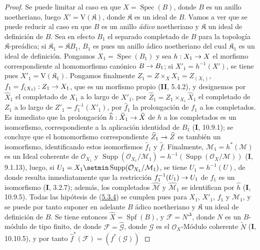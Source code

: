 \documentclass[10pt,oneside,openany]{book}
\theoremstyle{egaenv}\newtheorem*{env}{---}
\theoremstyle{egastatement}
\theoremstyle{egadescription}
\newcommand{\oldpage}[2][]{\marginnote{\normalfont\scriptsize\textbf{#1}\,|\,#2}\ignorespaces}
\renewcommand{\to}{\mathchoice{\longrightarrow}{\rightarrow}{\rightarrow}{\rightarrow}}
\begin{document}
\begin{proof}
Se puede limitar al caso en que $X=\operatorname{Spec}(B)$, donde $B$ es un anillo
noetheriano, luego $X'=\mathrm V(\mathfrak K)$, donde $\mathfrak K$ es un ideal de
$B$. Vamos a ver que se puede reducir al caso en que $B$ es un anillo \emph{ádico}
noetheriano y $\mathfrak K$ un ideal de definición de $B$. Sea en efecto $B_1$ el
separado completado de $B$ para la topología $\mathfrak K$-preádica; si
$\mathfrak K_1=\mathfrak K B_1$, $B_1$ es pues un
\oldpage[III]{155}
anillo ádico noetheriano del cual $\mathfrak K_1$ es un ideal de definición. Pongamos
$X_1=\operatorname{Spec}(B_1)$ y sea $h:X_1\to X$ el morfismo correspondiente al
homomorfismo canónico $B\to B_1$; si $X'_1=h^{-1}(X')$, se tiene pues
$X'_1=\mathrm V(\mathfrak K_1)$. Pongamos finalmente
$Z_1=Z\times_X X_1=Z_{(X_1)}$, $f_1=f_{(X_1)}:Z_1\to X_1$, que es un morfismo
propio (\textbf{II}, 5.4.2), y designemos por $\widehat X_1$ el completado de $X_1$ a lo largo
de $X'_1$, por
$\widehat Z_1=Z_1\times_{X_1}\widehat X_1$ el completado de $Z_1$ a lo largo de
$Z'_1=f_1^{-1}(X'_1)$, por $\widehat f_1$ la prolongación de $f_1$ a los completados.
Es inmediato que la prolongación $\widehat h:\widehat X_1\to\widehat X$ de $h$
a los completados es un isomorfismo, correspondiente a la aplicación identidad de $B_1$
(\textbf{I}, 10.9.1); se concluye que el homomorfismo correspondiente
$\widehat Z_1\to\widehat Z$ es también un isomorfismo, identificando estos isomorfismos
$\widehat f_1$ y $\widehat f$. Finalmente,
$\mathcal M_1=h^*(\mathcal M)$ es un Ideal coherente de $\mathcal O_{X_1}$ y
$\operatorname{Supp}(\mathcal O_{X_1}/\mathcal M_1)
=h^{-1}(\operatorname{Supp}(\mathcal O_X/\mathcal M))$
(\textbf{I}, 9.1.13), luego, si
$U_1=X_1\setmin\operatorname{Supp}(\mathcal O_{X_1}/\mathcal M_1)$, se tiene
$U_1=h^{-1}(U)$, de donde resulta inmediatamente que la restricción
$f_1^{-1}(U_1)\to U_1$ de $f_1$ es un isomorfismo (\textbf{I}, 3.2.7); además, los
completados $\widehat{\mathcal M}$ y $\widehat{\mathcal M}_1$ se identifican por
$\widehat h$ (\textbf{I}, 10.9.5). Todas las hipótesis de
(\hyperref[III.5.3.4-fr]{5.3.4}) se cumplen pues para $X_1$, $X'_1$, $f_1$ y
$\mathcal M_1$, y se puede por tanto suponer en adelante $B$ ádico noetheriano y
$\mathfrak K$ un ideal de definición de $B$. Se tiene entonces
$\widehat X=\operatorname{Spf}(B)$, y $\mathcal F=N^\Delta$, donde $N$ es un
$B$-módulo de tipo finito, de donde $\mathcal F=\widehat{\mathcal G}$, donde $\mathcal G$
es el $\mathcal O_X$-Módulo coherente $\widetilde N$ (\textbf{I}, 10.10.5), y por tanto
$\widehat f^{*}(\mathcal F)=(f^*(\mathcal G))^{\widehat{\,}}$

\end{proof}
\end{document}
